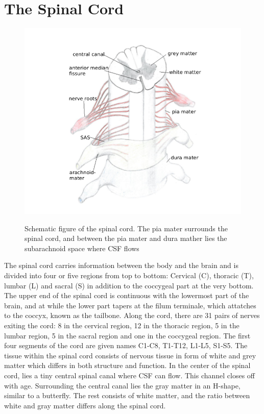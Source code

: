\section{The Spinal Cord}
\begin{center}
\begin{figure}[!ht]
\includegraphics[scale=0.3]{figures/Spinal_Cord} \\
\caption{Schematic figure of the spinal cord. The pia mater surrounds the spinal cord, and between the pia mater and dura mather lies the subarachnoid space where CSF flows} \label{fig:Cord}
\end{figure}
\end{center}
The spinal cord carries information between the body and the brain and is divided into four or five regions from top to bottom: Cervical (C), thoracic (T), lumbar (L) and sacral (S) in addition to the coccygeal part at the very bottom. The upper end of the spinal cord is continuous with the lowermost part of the brain, and at while the lower part tapers at the filum terminale, which attatches to the coccyx, known as the tailbone. Along the cord, there are 31 pairs of nerves exiting the cord: 8 in the cervical region, 12 in the thoracic region, 5 in the lumbar region, 5 in the sacral region and one in the coccygeal region. The first four segments of the cord are given names C1-C8, T1-T12, L1-L5, S1-S5. The tissue within the spinal cord consists of nervous tissue in form of white and grey matter which differs in both structure and function. In the center of the spinal cord, lies a tiny central spinal canal where CSF can flow. This channel closes off with age. Surrounding the central canal lies the gray matter in an H-shape, similar to a butterfly. The rest consists of white matter, and the ratio between white and gray matter differs along the spinal cord. 
